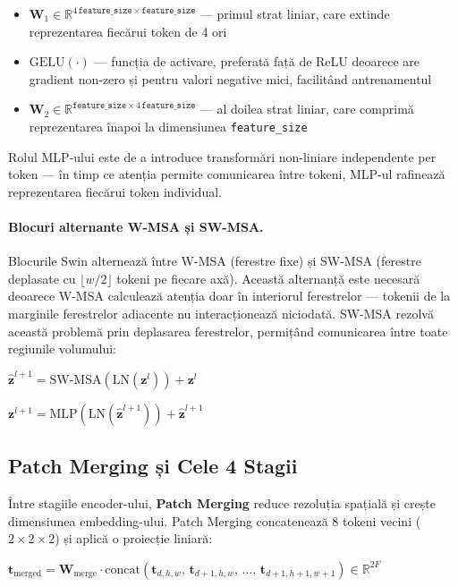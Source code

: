 \documentclass[12pt, a4paper]{report}
\newcommand{\formula}[1]{%
    \begin{center}
        \colorbox{codebackground}{%
            \parbox{0.88\textwidth}{\centering\vspace{4pt}$#1$\vspace{4pt}}%
        }
    \end{center}
}
\begin{document}
\begin{itemize}
    \item $\mathbf{W}_1 \in \mathbb{R}^{4\,\texttt{feature\_size}
    \times \texttt{feature\_size}}$ --- primul strat liniar, care
    extinde reprezentarea fiecărui token de 4 ori
    \item $\text{GELU}(\cdot)$ --- funcția de activare, preferată
    față de ReLU deoarece are gradient non-zero și pentru valori
    negative mici, facilitând antrenamentul
    \item $\mathbf{W}_2 \in \mathbb{R}^{\texttt{feature\_size}
    \times 4\,\texttt{feature\_size}}$ --- al doilea strat liniar,
    care comprimă reprezentarea înapoi la dimensiunea
    \texttt{feature\_size}
\end{itemize}

Rolul MLP-ului este de a introduce transformări non-liniare
independente per token — în timp ce atenția permite comunicarea
între tokeni, MLP-ul rafinează reprezentarea fiecărui token
individual.

\paragraph{Blocuri alternante W-MSA și SW-MSA.}
Blocurile Swin alternează între W-MSA (ferestre fixe) și SW-MSA
(ferestre deplasate cu $\lfloor w/2 \rfloor$ tokeni pe fiecare
axă). Această alternanță este necesară deoarece W-MSA calculează
atenția doar în interiorul ferestrelor — tokenii de la marginile
ferestrelor adiacente nu interacționează niciodată. SW-MSA
rezolvă această problemă prin deplasarea ferestrelor, permițând
comunicarea între toate regiunile volumului:

\formula{
    \hat{\mathbf{z}}^{l+1} = \text{SW-MSA}\!\left(\text{LN}(\mathbf{z}^l)\right) + \mathbf{z}^l
}
\formula{
    \mathbf{z}^{l+1} = \text{MLP}\!\left(\text{LN}(\hat{\mathbf{z}}^{l+1})\right) + \hat{\mathbf{z}}^{l+1}
}

\subsection{Patch Merging și Cele 4 Stagii}

Între stagiile encoder-ului, \textbf{Patch Merging} reduce rezoluția spațială
și crește dimensiunea embedding-ului. Patch Merging concatenează 8 tokeni vecini
($2\times2\times2$) și aplică o proiecție liniară:

\formula{
    \mathbf{t}_{\text{merged}} = \mathbf{W}_{\text{merge}} \cdot
    \text{concat}(\mathbf{t}_{d,h,w},\, \mathbf{t}_{d+1,h,w},\, \ldots,\, \mathbf{t}_{d+1,h+1,w+1})
    \in \mathbb{R}^{2F}
}
\end{document}
